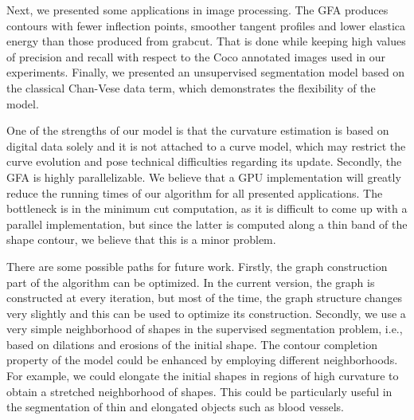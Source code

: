 \documentclass[review]{siamart220329}
\begin{document}
Next, we presented some applications in image processing. The GFA produces contours with fewer inflection points, smoother tangent profiles and lower elastica energy than those produced from grabcut. That is done while keeping high values of precision and recall with respect to the Coco annotated images used in our experiments. Finally, we presented an unsupervised segmentation model based on the classical Chan-Vese data term, which demonstrates the flexibility of the model. 

One of the strengths of our model is that the curvature estimation is based on digital data solely and it is not attached to a curve model, which may restrict the curve evolution and pose technical difficulties regarding its update. Secondly, the GFA is highly parallelizable. We believe that a GPU implementation will greatly reduce the running times of our algorithm for all presented applications. The bottleneck is in the minimum cut computation, as it is difficult to come up with a parallel implementation, but since the latter is computed along a thin band of the shape contour, we believe that this is a minor problem.

There are some possible paths for future work. Firstly, the graph construction part of the algorithm can be optimized. In the current version, the graph is constructed at every iteration, but most of the time, the graph structure changes very slightly and this can be used to optimize its construction. Secondly, we use a very simple neighborhood of shapes in the supervised segmentation problem, i.e., based on dilations and erosions of the initial shape. The contour completion property of the model could be enhanced by employing different neighborhoods. For example, we could elongate the initial shapes in regions of high curvature to obtain a stretched neighborhood of shapes. This could be particularly useful in the segmentation of thin and elongated objects such as blood vessels.
%
%
%
%


\end{document}
